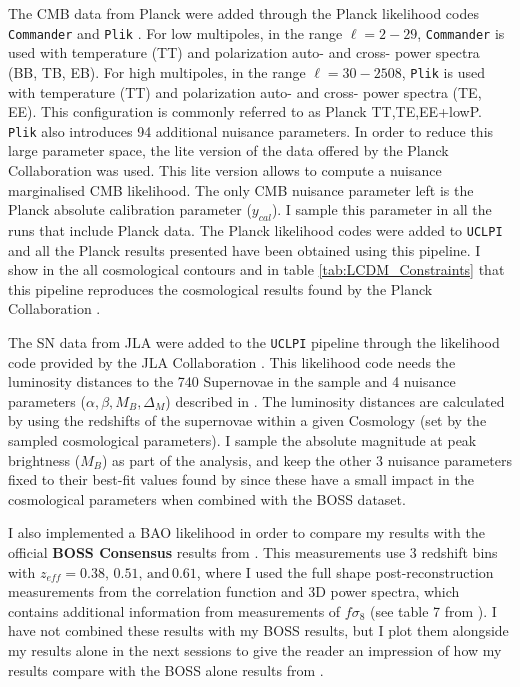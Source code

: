 \qquad The CMB data from Planck were added through the Planck likelihood codes \texttt{Commander} and \texttt{Plik} \citep{PlanckLikelihood2015}. For low multipoles, in the range $\ell=2-29$, \texttt{Commander} is used with temperature (TT) and polarization auto- and cross- power spectra (BB, TB, EB). For high multipoles, in the range $\ell=30-2508$, \texttt{Plik} is used with temperature (TT) and polarization auto- and cross- power spectra (TE, EE). This configuration is commonly referred to as Planck TT,TE,EE+lowP. \texttt{Plik} also introduces 94 additional nuisance parameters. In order to reduce this large parameter space, the lite version of the data offered by the Planck Collaboration was used. This lite version allows to compute a nuisance marginalised CMB likelihood. The only CMB nuisance parameter left is the Planck absolute calibration parameter ($y_{cal}$). I sample this parameter in all the runs that include Planck data. The Planck likelihood codes were added to \texttt{UCLPI} and all the Planck results presented have been obtained using this pipeline. I show in the all cosmological contours and in table \ref{tab:LCDM_Constraints} that this pipeline reproduces the cosmological results found by the Planck Collaboration \citep{PlanckCosmology2016}.

\qquad The SN data from JLA were added to the \texttt{UCLPI} pipeline through the likelihood code provided by the JLA Collaboration \citep{JLAdata}. This likelihood code needs the luminosity distances to the 740 Supernovae in the sample and 4 nuisance parameters ($\alpha, \beta, M_B, \Delta_M$) described in \cite{JLAdata}. The luminosity distances are calculated by \class \citep{Class} using the redshifts of the supernovae within a given Cosmology (set by the sampled cosmological parameters). I sample the absolute magnitude at peak brightness ($M_B$) as part of the analysis, and keep the other 3 nuisance parameters fixed to their best-fit values found by \cite{JLAdata} since these have a small impact in the cosmological parameters when combined with the BOSS dataset.

\qquad I also implemented a BAO likelihood in order to compare my results with the official \textbf{BOSS Consensus} results from \cite{2016BOSSCosmology}. This measurements use 3 redshift bins with $z_{eff} = 0.38, \, 0.51, \, \text{and} \, 0.61 $, where I used the full shape post-reconstruction measurements from the correlation function and 3D power spectra, which contains additional information from measurements of $f\sigma_8$ (see table 7 from \cite{2016BOSSCosmology}). I have not combined these results with my BOSS results, but I plot them alongside my results alone in the next sessions to give the reader an impression of how my results compare with the BOSS alone results from \cite{2016BOSSCosmology}.

